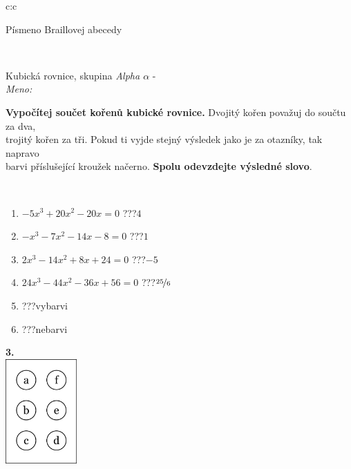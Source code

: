 \documentclass[10pt]{report}
\begin{document}
\begin{tabular}{c:c}
\begin{minipage}[c][104.5mm][t]{0.5\linewidth}
\begin{center}
\begin{minipage}{0.20\linewidth}
\begin{center}
{\small Písmeno Braillovej abecedy}
\end{center}
\end{minipage}
\end{center}
\end{minipage}
\\ \hdashline
\begin{minipage}[c][104.5mm][t]{0.5\linewidth}
\begin{center}
\vspace{7mm}
{\huge Kubická rovnice, skupina \textit{Alpha $\alpha$} -}\\[5mm]
\textit{Meno:}\phantom{xxxxxxxxxxxxxxxxxxxxxxxxxxxxxxxxxxxxxxxxxxxxxxxxxxxxxxxxxxxxxxxxx}\\[5mm]
\begin{minipage}{0.95\linewidth}
\textbf{Vypočítej součet kořenů kubické rovnice.} Dvojitý kořen považuj do součtu za dva,\\trojitý kořen za tři. Pokud ti vyjde stejný výsledek jako je za otazníky, tak napravo\\barvi příslušející kroužek načerno. \textbf{Spolu odevzdejte výsledné slovo}.
\end{minipage}
\\[1mm]
\begin{minipage}{0.79\linewidth}
\begin{center}
\begin{varwidth}{\linewidth}
\begin{enumerate}
\Large
\item $-5x^3+20x^2-20x=0$\quad \dotfill\; ???\;\dotfill \quad $4$
\item $-x^3-7x^2-14x-8=0$\quad \dotfill\; ???\;\dotfill \quad $1$
\item $2x^3-14x^2+8x+24=0$\quad \dotfill\; ???\;\dotfill \quad $-5$
\item $24x^3-44x^2-36x+56=0$\quad \dotfill\; ???\;\dotfill \quad $\nicefrac{25}{6}$
\item \quad \dotfill\; ???\;\dotfill \quad vybarvi
\item \quad \dotfill\; ???\;\dotfill \quad nebarvi
\end{enumerate}
\end{varwidth}
\end{center}
\end{minipage}
\begin{minipage}{0.20\linewidth}
\begin{center}
{\Huge\bfseries 3.} \\[2mm]
\includegraphics[height=40mm]{../images/braille.png}

\end{center}
\end{minipage}
\end{center}
\end{minipage}
\end{tabular}
\end{document}
